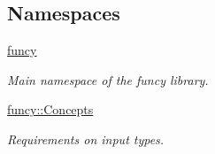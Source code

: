 \subsection*{Namespaces}
\begin{DoxyCompactItemize}
\item 
\hyperlink{namespacefuncy}{funcy}
\begin{DoxyCompactList}\small\item\em Main namespace of the funcy library. \end{DoxyCompactList}\item 
\hyperlink{namespacefuncy_1_1Concepts}{funcy\-::\-Concepts}
\begin{DoxyCompactList}\small\item\em Requirements on input types. \end{DoxyCompactList}\end{DoxyCompactItemize}
